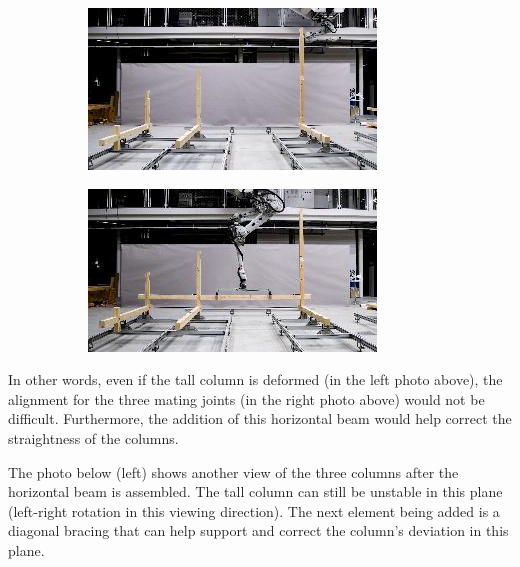 \documentclass[11pt]{book}
\begin{document}
\begin{figure}[H]
\centering
\begin{subfigure}[b]{0.45\textwidth}
\centering
\includegraphics[width=\textwidth]{./images/image61.jpeg}
\end{subfigure}
\hfill
\begin{subfigure}[b]{0.45\textwidth}
\centering
\includegraphics[width=\textwidth]{./images/image62.jpeg}
\end{subfigure}
\end{figure}


In other words, even if the tall column is deformed (in the left photo above), the alignment for the three mating joints (in the right photo above) would not be difficult. Furthermore, the addition of this horizontal beam would help correct the straightness of the columns.

The photo below (left) shows another view of the three columns after the horizontal beam is assembled. The tall column can still be unstable in this plane (left-right rotation in this viewing direction). The next element being added is a diagonal bracing that can help support and correct the column’s deviation in this plane.
\end{document}
